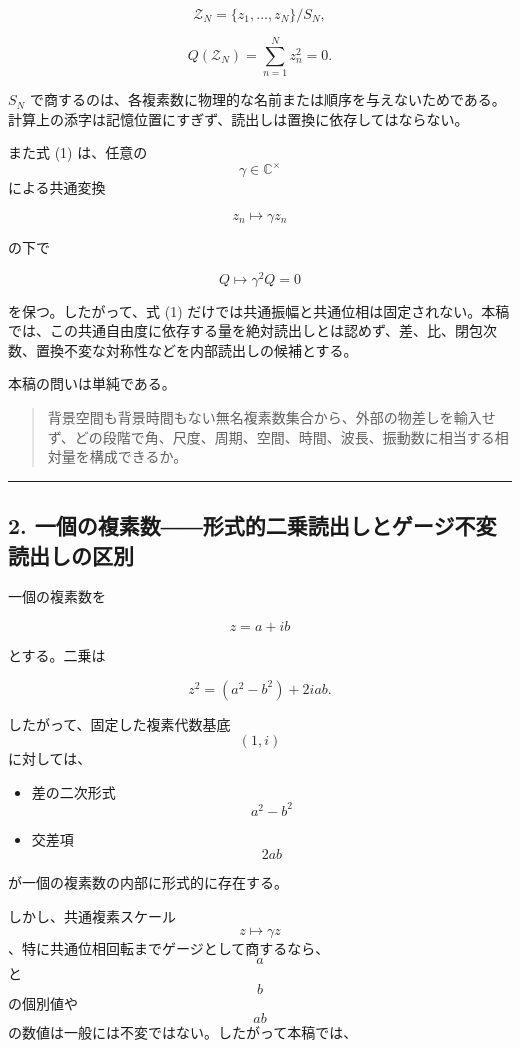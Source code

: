 \documentclass[
  a4paper,
]{ltjsarticle}
\providecommand{\tightlist}{%
  \setlength{\itemsep}{0pt}\setlength{\parskip}{0pt}}
\begin{document}
\[
\mathcal Z_N
=
\{z_1,\ldots,z_N\}/S_N,
\]

\[
Q(\mathcal Z_N)
=
\sum_{n=1}^{N}z_n^2
=0.
\tag{1}
\]

\(S_N\)
で商するのは、各複素数に物理的な名前または順序を与えないためである。計算上の添字は記憶位置にすぎず、読出しは置換に依存してはならない。

また式 (1) は、任意の \[\gamma\in\mathbb C^\times\] による共通変換

\[
z_n\mapsto \gamma z_n
\]

の下で

\[
Q\mapsto \gamma^2Q=0
\]

を保つ。したがって、式 (1)
だけでは共通振幅と共通位相は固定されない。本稿では、この共通自由度に依存する量を絶対読出しとは認めず、差、比、閉包次数、置換不変な対称性などを内部読出しの候補とする。

本稿の問いは単純である。

\begin{quote}
背景空間も背景時間もない無名複素数集合から、外部の物差しを輸入せず、どの段階で角、尺度、周期、空間、時間、波長、振動数に相当する相対量を構成できるか。
\end{quote}

\begin{center}\rule{0.5\linewidth}{0.5pt}\end{center}

\subsection{2.
一個の複素数――形式的二乗読出しとゲージ不変読出しの区別}\label{ux4e00ux500bux306eux8907ux7d20ux6570ux5f62ux5f0fux7684ux4e8cux4e57ux8aadux51faux3057ux3068ux30b2ux30fcux30b8ux4e0dux5909ux8aadux51faux3057ux306eux533aux5225}

一個の複素数を

\[
z=a+ib
\]

とする。二乗は

\[
z^2=(a^2-b^2)+2iab.
\tag{2}
\]

したがって、固定した複素代数基底 \[(1,i)\] に対しては、

\begin{itemize}
\tightlist
\item
  差の二次形式 \[a^2-b^2\]
\item
  交差項 \[2ab\]
\end{itemize}

が一個の複素数の内部に形式的に存在する。

しかし、共通複素スケール
\[z\mapsto\gamma z\]、特に共通位相回転までゲージとして商するなら、\[a\]
と \[b\] の個別値や \[ab\]
の数値は一般には不変ではない。したがって本稿では、
\end{document}
